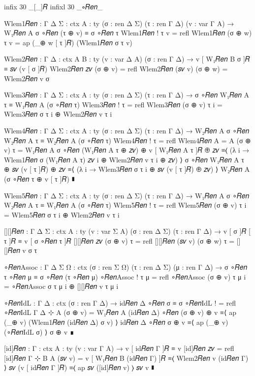 \begin{code}[hide]
  infix 30 _[_]𝑅
  infixl 30 _∘𝑅𝑒𝑛_

  Wlem1𝑅𝑒𝑛 : {Γ Δ Σ : ctx} {A : ty} (σ : ren Δ Σ) (τ : ren Γ Δ) (v : var Γ A) →
    W₁𝑅𝑒𝑛 A σ ∘𝑅𝑒𝑛 (τ ⊕ v) ≡ σ ∘𝑅𝑒𝑛 τ
  Wlem1𝑅𝑒𝑛 ! τ v = refl
  Wlem1𝑅𝑒𝑛 (σ ⊕ w) τ v = ap (_⊕ w [ τ ]𝑅) (Wlem1𝑅𝑒𝑛 σ τ v)

  Wlem2𝑅𝑒𝑛 : {Γ Δ : ctx} {A B : ty} (v : var Δ A) (σ : ren Γ Δ) →
    v [ W₁𝑅𝑒𝑛 B σ ]𝑅 ≡ 𝑠𝑣 (v [ σ ]𝑅)
  Wlem2𝑅𝑒𝑛 𝑧𝑣 (σ ⊕ v) = refl
  Wlem2𝑅𝑒𝑛 (𝑠𝑣 v) (σ ⊕ w) = Wlem2𝑅𝑒𝑛 v σ

  Wlem3𝑅𝑒𝑛 : {Γ Δ Σ : ctx} {A : ty} (σ : ren Δ Σ) (τ : ren Γ Δ) →
    σ ∘𝑅𝑒𝑛 W₁𝑅𝑒𝑛 A τ ≡ W₁𝑅𝑒𝑛 A (σ ∘𝑅𝑒𝑛 τ)
  Wlem3𝑅𝑒𝑛 ! τ = refl
  Wlem3𝑅𝑒𝑛 (σ ⊕ v) τ i = Wlem3𝑅𝑒𝑛 σ τ i ⊕ Wlem2𝑅𝑒𝑛 v τ i

  Wlem4𝑅𝑒𝑛 : {Γ Δ Σ : ctx} {A : ty} (σ : ren Δ Σ) (τ : ren Γ Δ) →
    W₂𝑅𝑒𝑛 A σ ∘𝑅𝑒𝑛 W₂𝑅𝑒𝑛 A τ ≡ W₂𝑅𝑒𝑛 A (σ ∘𝑅𝑒𝑛 τ)
  Wlem4𝑅𝑒𝑛 ! τ = refl
  Wlem4𝑅𝑒𝑛 {A = A} (σ ⊕ v) τ =
    W₁𝑅𝑒𝑛 A σ ∘𝑅𝑒𝑛 (W₁𝑅𝑒𝑛 A τ ⊕ 𝑧𝑣) ⊕ v [ W₁𝑅𝑒𝑛 A τ ]𝑅 ⊕ 𝑧𝑣
      ≡⟨ (λ i → Wlem1𝑅𝑒𝑛 σ (W₁𝑅𝑒𝑛 A τ) 𝑧𝑣 i ⊕ Wlem2𝑅𝑒𝑛 v τ i ⊕ 𝑧𝑣) ⟩
    σ ∘𝑅𝑒𝑛 W₁𝑅𝑒𝑛 A τ ⊕ 𝑠𝑣 (v [ τ ]𝑅) ⊕ 𝑧𝑣
      ≡⟨ (λ i → Wlem3𝑅𝑒𝑛 σ τ i ⊕ 𝑠𝑣 (v [ τ ]𝑅) ⊕ 𝑧𝑣) ⟩
    W₂𝑅𝑒𝑛 A (σ ∘𝑅𝑒𝑛 τ ⊕ v [ τ ]𝑅)
      ∎

  Wlem5𝑅𝑒𝑛 : {Γ Δ Σ : ctx} {A : ty} (σ : ren Δ Σ) (τ : ren Γ Δ) →
    W₁𝑅𝑒𝑛 A σ ∘𝑅𝑒𝑛 W₂𝑅𝑒𝑛 A τ ≡ W₁𝑅𝑒𝑛 A (σ ∘𝑅𝑒𝑛 τ)
  Wlem5𝑅𝑒𝑛 ! τ = refl
  Wlem5𝑅𝑒𝑛 (σ ⊕ v) τ i = Wlem5𝑅𝑒𝑛 σ τ i ⊕ Wlem2𝑅𝑒𝑛 v τ i

  [][]𝑅𝑒𝑛 : {Γ Δ Σ : ctx} {A : ty} (v : var Σ A) (σ : ren Δ Σ) (τ : ren Γ Δ) →
    v [ σ ]𝑅 [ τ ]𝑅 ≡ v [ σ ∘𝑅𝑒𝑛 τ ]𝑅
  [][]𝑅𝑒𝑛 𝑧𝑣 (σ ⊕ v) τ = refl
  [][]𝑅𝑒𝑛 (𝑠𝑣 v) (σ ⊕ w) τ = [][]𝑅𝑒𝑛 v σ τ

  ∘𝑅𝑒𝑛Assoc : {Γ Δ Σ Ω : ctx} (σ : ren Σ Ω) (τ : ren Δ Σ) (μ : ren Γ Δ) →
    σ ∘𝑅𝑒𝑛 τ ∘𝑅𝑒𝑛 μ ≡ σ ∘𝑅𝑒𝑛 (τ ∘𝑅𝑒𝑛 μ)
  ∘𝑅𝑒𝑛Assoc ! τ μ = refl
  ∘𝑅𝑒𝑛Assoc (σ ⊕ v) τ μ i = ∘𝑅𝑒𝑛Assoc σ τ μ i ⊕ [][]𝑅𝑒𝑛 v τ μ i

  ∘𝑅𝑒𝑛IdL : {Γ Δ : ctx} (σ : ren Γ Δ) → id𝑅𝑒𝑛 Δ ∘𝑅𝑒𝑛 σ ≡ σ
  ∘𝑅𝑒𝑛IdL ! = refl
  ∘𝑅𝑒𝑛IdL {Γ} {Δ ⊹ A} (σ ⊕ v) =
    W₁𝑅𝑒𝑛 A (id𝑅𝑒𝑛 Δ) ∘𝑅𝑒𝑛 (σ ⊕ v) ⊕ v
      ≡⟨ ap (_⊕ v) (Wlem1𝑅𝑒𝑛 (id𝑅𝑒𝑛 Δ) σ v) ⟩
    id𝑅𝑒𝑛 Δ ∘𝑅𝑒𝑛 σ ⊕ v
      ≡⟨ ap (_⊕ v) (∘𝑅𝑒𝑛IdL σ) ⟩
    σ ⊕ v
      ∎

  [id]𝑅𝑒𝑛 : {Γ : ctx} {A : ty} (v : var Γ A) →
    v [ id𝑅𝑒𝑛 Γ ]𝑅 ≡ v
  [id]𝑅𝑒𝑛 𝑧𝑣 = refl
  [id]𝑅𝑒𝑛 {Γ ⊹ B} {A} (𝑠𝑣 v) =
    v [ W₁𝑅𝑒𝑛 B (id𝑅𝑒𝑛 Γ) ]𝑅
      ≡⟨ Wlem2𝑅𝑒𝑛 v (id𝑅𝑒𝑛 Γ) ⟩
    𝑠𝑣 (v [ id𝑅𝑒𝑛 Γ ]𝑅)
      ≡⟨ ap 𝑠𝑣 ([id]𝑅𝑒𝑛 v) ⟩
    𝑠𝑣 v
      ∎
\end{code}

